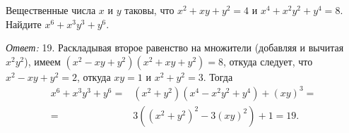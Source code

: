 \problem
Вещественные числа $x$ и $y$ таковы, что
$x^2 + x y + y^2 = 4$ и $x^4 + x^2 y^2 + y^4 = 8$.
Найдите $x^6 + x^3 y^3 + y^6$.

\solution
\emph{Ответ:} 19.
Раскладывая второе равенство на множители (добавляя и вычитая $x^2 y^2$), имеем
$(x^2 - x y + y^2) (x^2 + x y + y^2) = 8$,
откуда следует, что $x^2  - x y + y^2 = 2$,
откуда $x y = 1$ и $x^2 + y^2 = 3$.
Тогда
\begin{align*}
    x^6 + x^3 y^3 + y^6
={}&
    (x^2 + y^2) (x^4 - x^2 y^2 + y^4) + (x y)^3
=\\={}&
    3((x^2 + y^2)^2 - 3 (x y)^2) + 1 = 19
.\end{align*}

\endproblem
